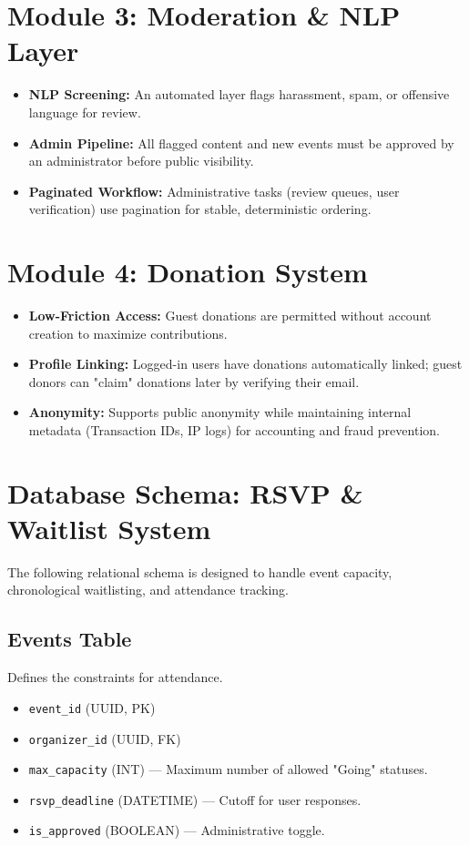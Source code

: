 \documentclass[11pt]{article}
\begin{document}
\pagebreak

\section{Module 3: Moderation \& NLP Layer}
\begin{itemize}
    \item \textbf{NLP Screening:} An automated layer flags harassment, spam, or offensive language for review.
    \item \textbf{Admin Pipeline:} All flagged content and new events must be approved by an administrator before public visibility.
    \item \textbf{Paginated Workflow:} Administrative tasks (review queues, user verification) use pagination for stable, deterministic ordering.
\end{itemize}

\section{Module 4: Donation System}
\begin{itemize}
    \item \textbf{Low-Friction Access:} Guest donations are permitted without account creation to maximize contributions.
    \item \textbf{Profile Linking:} Logged-in users have donations automatically linked; guest donors can "claim" donations later by verifying their email.
    \item \textbf{Anonymity:} Supports public anonymity while maintaining internal metadata (Transaction IDs, IP logs) for accounting and fraud prevention.
\end{itemize}

\newpage
\section{Database Schema: RSVP \& Waitlist System}
The following relational schema is designed to handle event capacity, chronological waitlisting, and attendance tracking.

\subsection{Events Table}
Defines the constraints for attendance.
\begin{itemize}
    \item \texttt{event\_id} (UUID, PK)
    \item \texttt{organizer\_id} (UUID, FK)
    \item \texttt{max\_capacity} (INT) --- Maximum number of allowed "Going" statuses.
    \item \texttt{rsvp\_deadline} (DATETIME) --- Cutoff for user responses.
    \item \texttt{is\_approved} (BOOLEAN) --- Administrative toggle.
\end{itemize}
\end{document}
